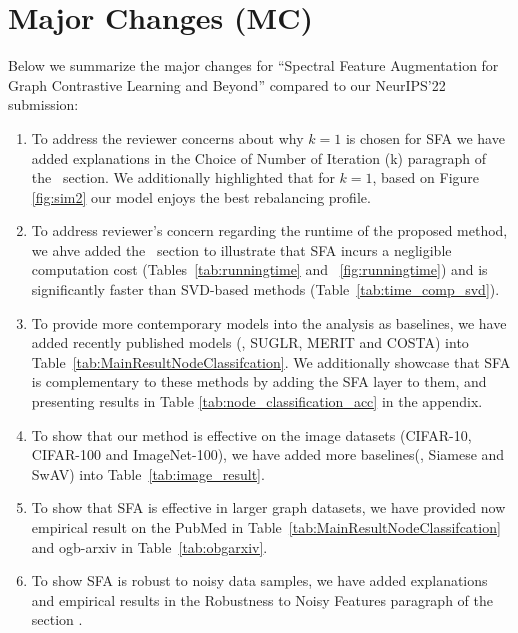 \section{Major Changes (MC)}

\vspace{0.2cm}
Below we summarize the major changes for ``{\color{teal}Spectral Feature Augmentation for Graph Contrastive Learning and Beyond}'' compared to our NeurIPS'22 submission:

\vspace{0.2cm}
\begin{enumerate}
    \item To address the reviewer concerns about why $k=1$ is chosen for SFA we have added explanations in the  {\color{blue} Choice of Number of Iteration (k)} paragraph of  the~ section. We additionally highlighted that for $k=1$, based on Figure \ref{fig:sim2} our model enjoys the best rebalancing profile.
    
    \item To address reviewer's concern regarding the runtime of the proposed method, we ahve added  the~ section to illustrate that SFA incurs a negligible computation cost (Tables~\ref{tab:runningtime} and ~\ref{fig:runningtime}) and is significantly faster than SVD-based methods  (Table~\ref{tab:time_comp_svd}).
    
    \item To provide more contemporary models into the analysis as baselines, we have added recently published models (\ie, SUGLR, MERIT and COSTA) into Table~\ref{tab:MainResultNodeClassifcation}. 
    We additionally showcase that SFA is complementary to these methods by adding the SFA layer to them, and presenting results in  Table \ref{tab:node_classification_acc}  in the appendix.
    
    \item To show that our method is effective on the image datasets (CIFAR-10, CIFAR-100 and ImageNet-100), we have added more baselines(\ie, Siamese and SwAV) into Table~\ref{tab:image_result}.
    
    
    \item To show that SFA is effective in larger graph datasets, we have provided now empirical result on the PubMed in Table~\ref{tab:MainResultNodeClassifcation} and ogb-arxiv in Table~\ref{tab:obgarxiv}.
    
    
    \item To show SFA is robust to noisy data samples, we have added explanations and empirical results in the  {\color{blue} Robustness to Noisy Features} paragraph of the section .
    

\end{enumerate}
